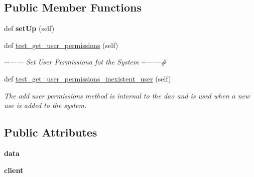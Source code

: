 \subsection*{Public Member Functions}
\begin{DoxyCompactItemize}
\item 
\mbox{\label{classtests_1_1test__10__add__get__user__permissions_1_1_test_user_routes_accf0a2722828eb607e36d3086d7afe9d}} 
def {\bfseries set\+Up} (self)
\item 
def \hyperlink{classtests_1_1test__10__add__get__user__permissions_1_1_test_user_routes_ab7fe8e4ef631c1135a9f04a0ed65529e}{test\+\_\+get\+\_\+user\+\_\+permissions} (self)
\begin{DoxyCompactList}\small\item\em -\/-\/------ Set User Permissiona fot the System -\/-\/------\# \end{DoxyCompactList}\item 
def \hyperlink{classtests_1_1test__10__add__get__user__permissions_1_1_test_user_routes_a2b328350cbc919c043bfd439fecc484e}{test\+\_\+get\+\_\+user\+\_\+permissions\+\_\+inexistent\+\_\+user} (self)
\begin{DoxyCompactList}\small\item\em The add user permissions method is internal to the dao and is used when a new use is added to the system. \end{DoxyCompactList}\end{DoxyCompactItemize}
\subsection*{Public Attributes}
\begin{DoxyCompactItemize}
\item 
\mbox{\label{classtests_1_1test__10__add__get__user__permissions_1_1_test_user_routes_a1e0086199f4f7383a884884e370d3259}} 
{\bfseries data}
\item 
\mbox{\label{classtests_1_1test__10__add__get__user__permissions_1_1_test_user_routes_a902a9756684c0ca1589838024629958b}} 
{\bfseries client}
\end{DoxyCompactItemize}


